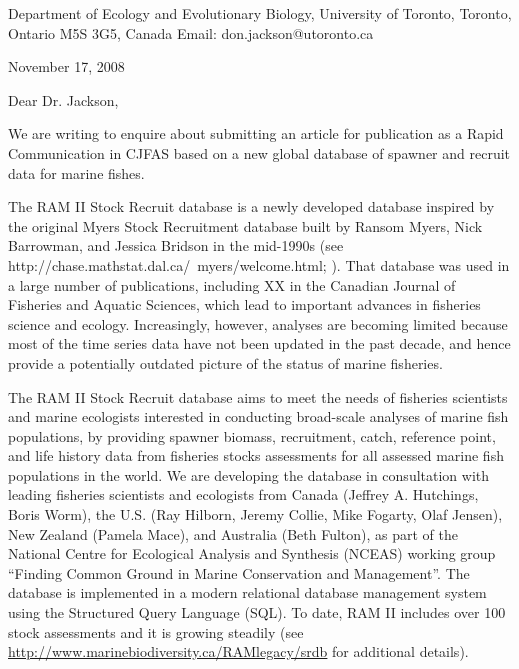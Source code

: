 \documentclass[10pt,oneside]{refletter}
\date{2008-11-14}
\begin{document}
Department of Ecology and Evolutionary Biology,
University of Toronto,
Toronto, Ontario M5S 3G5, Canada
Email: don.jackson@utoronto.ca

November 17, 2008

Dear Dr. Jackson, 

We are writing to enquire about submitting an article for publication as a Rapid Communication in CJFAS based on a new global database of spawner and recruit data for marine fishes. 
	
The RAM II Stock Recruit database is a newly developed database inspired by the original Myers Stock Recruitment database built by Ransom Myers, Nick Barrowman, and Jessica Bridson in the mid-1990s (see http://chase.mathstat.dal.ca/~myers/welcome.html; \citep{Myersetal1995a}). That database was used in a large number of publications, including XX in the Canadian Journal of Fisheries and Aquatic Sciences, which lead to important advances in fisheries science and ecology. Increasingly, however, analyses are becoming limited because most of the time series data have not been updated in the past decade, and hence provide a potentially outdated picture of the status of marine fisheries.

The RAM II Stock Recruit database aims to meet the needs of fisheries scientists and marine ecologists interested in conducting broad-scale analyses of marine fish populations, by providing spawner biomass, recruitment, catch, reference point, and life history data from fisheries stocks assessments for all assessed marine fish populations in the world. We are developing the database in consultation with leading fisheries scientists and ecologists from Canada (Jeffrey A. Hutchings, Boris Worm), the U.S. (Ray Hilborn, Jeremy Collie, Mike Fogarty, Olaf Jensen), New Zealand (Pamela Mace), and Australia (Beth Fulton), as part of the National Centre for Ecological Analysis and Synthesis (NCEAS) working group ``Finding Common Ground in Marine Conservation and Management''. The database is implemented in a modern relational database management system using the Structured Query Language (SQL). To date, RAM II includes over 100 stock assessments and it is growing steadily (see \url{http://www.marinebiodiversity.ca/RAMlegacy/srdb} for additional details). 
\end{document}
